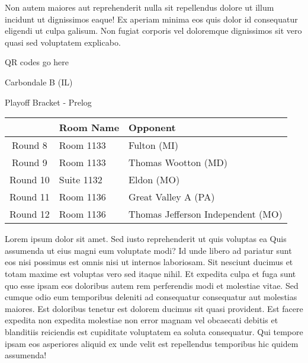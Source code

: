 \documentclass{article}%
\begin{document}
\newline%
Non autem maiores aut reprehenderit nulla sit repellendus dolore ut illum incidunt ut dignissimos eaque! Ex aperiam minima eos quis dolor id consequatur eligendi ut culpa galisum. Non fugiat corporis vel doloremque dignissimos sit vero quasi sed voluptatem explicabo.\newline%
\newline%
%
\vspace*{30pt}%
\begin{center}%
\begin{Huge}%
QR codes go here%
\end{Huge}%
\end{center}%
\newpage%
\begin{center}%
\begin{Huge}%
Carbondale B (IL)%
\end{Huge}%
\vspace*{8pt}%
\linebreak%
\begin{Large}%
Playoff Bracket {-} Prelog%
\end{Large}%
\end{center}%
\begin{tabularx}{\textwidth}{|c|Y|Y|}%
\hline%
&Room Name&Opponent\\%
\hline%
Round 8&Room 1133&Fulton (MI)\\%
Round 9&Room 1133&Thomas Wootton (MD)\\%
Round 10&Suite 1132&Eldon (MO)\\%
Round 11&Room 1136&Great Valley A (PA)\\%
Round 12&Room 1136&Thomas Jefferson Independent (MO)\\%
\hline%
\end{tabularx}%
\vspace*{8pt}%
\linebreak%
\newline%
\newline%
Lorem ipsum dolor sit amet. Sed iusto reprehenderit ut quis voluptas ea Quis assumenda ut eius magni eum voluptate modi? Id unde libero ad pariatur sunt eos nisi possimus est omnis nisi ut internos laboriosam. Sit nesciunt ducimus et totam maxime est voluptas vero sed itaque nihil. Et expedita culpa et fuga sunt quo esse ipsam eos doloribus autem rem perferendis modi et molestiae vitae.\newline%
\newline%
Sed cumque odio eum temporibus deleniti ad consequatur consequatur aut molestias maiores. Est doloribus tenetur est dolorem ducimus sit quasi provident. Est facere expedita non expedita molestiae non error magnam vel obcaecati debitis et blanditiis reiciendis est cupiditate voluptatem ea soluta consequatur. Qui tempore ipsam eos asperiores aliquid ex unde velit est repellendus temporibus hic quidem assumenda!\newline%
\end{document}
